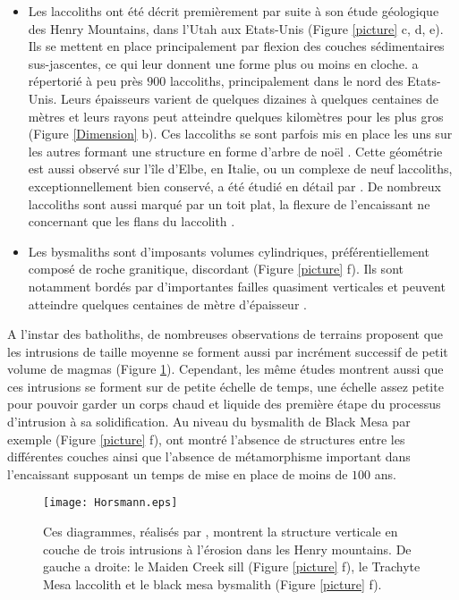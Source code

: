 \begin{itemize}
\item    Les   laccoliths    ont   été    décrit   premièrement    par
  \citet{Gilbert:1877uk}  suite  à  son  étude  géologique  des  Henry
  Mountains, dans  l'Utah aux  Etats-Unis (Figure \ref{picture}  c, d,
  e).  Ils se mettent en  place principalement par flexion des couches
  sédimentaires sus-jascentes, ce  qui leur donnent une  forme plus ou
  moins en  cloche.  \citet{E:2015tl}  a répertorié  à peu  près $900$
  laccoliths,  principalement  dans  le nord  des  Etats-Unis.   Leurs
  épaisseurs  varient de  quelques  dizaines à  quelques centaines  de
  mètres et leurs  rayons peut atteindre quelques  kilomètres pour les
  plus  gros  (Figure  \ref{Dimension}  b).  Ces  laccoliths  se  sont
  parfois mis en place les uns sur les autres formant une structure en
  forme d'arbre  de noël \citep{E:2015tl}.  Cette  géométrie est aussi
  observé  sur  l'île  d'Elbe,  en  Italie, ou  un  complexe  de  neuf
  laccoliths, exceptionnellement bien conservé, a été étudié en détail
  par \citet{Rocchi:2002jy}. De nombreux  laccoliths sont aussi marqué
  par un toit  plat, la flexure de l'encaissant ne  concernant que les
  flans du laccolith \citep{Koch:1981if}.

\item   Les   bysmaliths   sont  d'imposants   volumes   cylindriques,
  préférentiellement composé  de roche granitique,  discordant (Figure
  \ref{picture}  f).   Ils  sont notamment  bordés  par  d'importantes
  failles quasiment verticales et peuvent atteindre quelques centaines
  de mètre d'épaisseur \citep{Johnson:1973ho}.
\end{itemize}

A  l'instar des  batholiths,  de nombreuses  observations de  terrains
proposent que  les intrusions de  taille moyenne se forment  aussi par
incrément     successif     de      petit     volume     de     magmas
\citep{Habert:2004wg,Horsman:2005ct}      (Figure     \ref{Horsmann}).
Cependant,  les  même études  montrent  aussi  que ces  intrusions  se
forment sur de petite échelle de  temps, une échelle assez petite pour
pouvoir  garder  un corps  chaud  et  liquide  des première  étape  du
processus d'intrusion à  sa solidification. Au niveau  du bysmalith de
Black Mesa par exemple (Figure \ref{picture} f), \citet{Habert:2004wg}
ont montré l'absence de structures entre les différentes couches ainsi
que l'absence  de métamorphisme important dans  l'encaissant supposant
un temps de mise en place de moins de $100$ ans.

\begin{figure}[h!]
  \begin{center}
    \graphicspath{ {/Users/thorey/Documents/These/Manuscript/Figure/Chapter1/} }
    \texttt{[image: Horsmann.eps]}
    \caption{Ces  diagrammes,  réalisés  par  \citet{Horsman:2009gea},
      montrent la structure verticale en  couche de trois intrusions à
      l'érosion  dans les  Henry  mountains. De  gauche  a droite:  le
      Maiden  Creek sill  (Figure \ref{picture}  f), le  Trachyte Mesa
      laccolith et le black mesa bysmalith (Figure \ref{picture} f).}
    \label{Horsmann}
  \end{center}
\end{figure}

